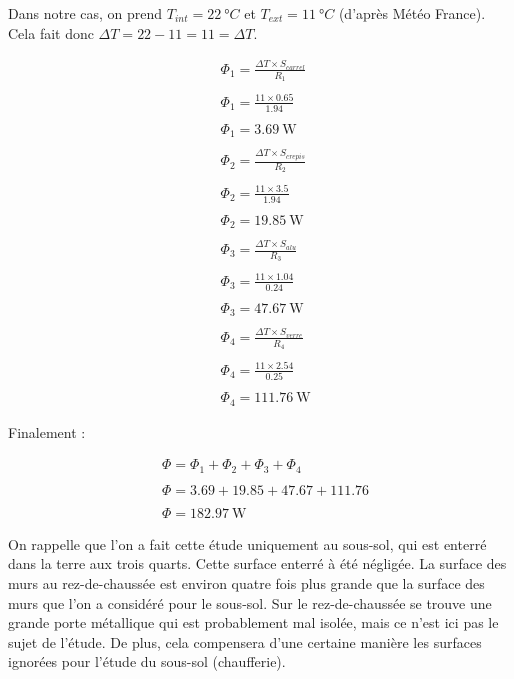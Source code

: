 \documentclass[12pt, a4paper]{article}
\newcommand{\TInt}{\ensuremath{T_{int}}}
\newcommand{\TExt}{\ensuremath{T_{ext}}}
\newcommand{\RUn}{\ensuremath{R_{1}}}
\newcommand{\RDeux}{\ensuremath{R_{2}}}
\newcommand{\RTrois}{\ensuremath{R_{3}}}
\newcommand{\RQuatre}{\ensuremath{R_{4}}}
\newcommand{\phiUn}{\ensuremath{\Phi_{1}}}
\newcommand{\phiDeux}{\ensuremath{\Phi_{2}}}
\newcommand{\phiTrois}{\ensuremath{\Phi_{3}}}
\newcommand{\phiQuatre}{\ensuremath{\Phi_{4}}}
\newcommand{\deltaT}{\ensuremath{\Delta T}}
\newcommand{\SCarrel}{\ensuremath{S_{carrel}}}
\newcommand{\SCrepis}{\ensuremath{S_{crepis}}}
\newcommand{\SAlu}{\ensuremath{S_{alu}}}
\newcommand{\SVerre}{\ensuremath{S_{verre}}}
\begin{document}
Dans notre cas, on prend $\TInt = \SI{22}{\degree C}$ et $\TExt = \SI{11}{\degree C}$ (d'après Météo France). Cela fait donc $\deltaT = 22 - 11 = \boxed{11 = \deltaT}$.

\begin{align*}
 & \phiUn = \frac{\deltaT \times \SCarrel}{\RUn} \\ \\
 & \phiUn = \frac{11 \times 0.65}{1.94} \\ \\
 & \boxed{\phiUn = \SI{3.69}{\watt}} \\ \\
 & \phiDeux = \frac{\deltaT \times \SCrepis}{\RDeux} \\ \\
 & \phiDeux = \frac{11 \times 3.5}{1.94} \\ \\
 & \boxed{\phiDeux = \SI{19.85}{\watt}} \\ \\
 & \phiTrois = \frac{\deltaT \times \SAlu}{\RTrois} \\ \\
 & \phiTrois = \frac{11 \times 1.04}{0.24} \\ \\
 & \boxed{\phiTrois = \SI{47.67}{\watt}} \\ \\
 & \phiQuatre = \frac{\deltaT \times \SVerre}{\RQuatre} \\ \\
 & \phiQuatre = \frac{11 \times 2.54}{0.25} \\ \\
 & \boxed{\phiQuatre = \SI{111.76}{\watt}}
\end{align*}

\bigskip

Finalement :

\begin{align*}
 & \Phi = \phiUn + \phiDeux + \phiTrois + \phiQuatre \\ \\
 & \Phi = 3.69 + 19.85 + 47.67 + 111.76 \\ \\
 & \boxed{\Phi = \SI{182.97}{\watt}}
\end{align*}

\bigskip

On rappelle que l'on a fait cette étude uniquement au sous-sol, qui est enterré dans la terre aux trois quarts. Cette surface enterré à été négligée. La surface des murs au rez-de-chaussée est environ quatre fois plus grande que la surface des murs que l'on a considéré pour le sous-sol. Sur le rez-de-chaussée se trouve une grande porte métallique qui est probablement mal isolée, mais ce n'est ici pas le sujet de l'étude. De plus, cela compensera d'une certaine manière les surfaces ignorées pour l'étude du sous-sol (chaufferie).
\end{document}
